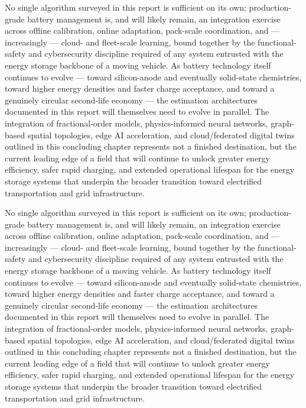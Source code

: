 No single algorithm surveyed in this report is sufficient on its own; production-grade battery management is, and will likely remain, an integration exercise across offline calibration, online adaptation, pack-scale coordination, and — increasingly — cloud- and fleet-scale learning, bound together by the functional-safety and cybersecurity discipline required of any system entrusted with the energy storage backbone of a moving vehicle. As battery technology itself continues to evolve — toward silicon-anode and eventually solid-state chemistries, toward higher energy densities and faster charge acceptance, and toward a genuinely circular second-life economy — the estimation architectures documented in this report will themselves need to evolve in parallel. The integration of fractional-order models, physics-informed neural networks, graph-based spatial topologies, edge AI acceleration, and cloud/federated digital twins outlined in this concluding chapter represents not a finished destination, but the current leading edge of a field that will continue to unlock greater energy efficiency, safer rapid charging, and extended operational lifespan for the energy storage systems that underpin the broader transition toward electrified transportation and grid infrastructure.

No single algorithm surveyed in this report is sufficient on its own; production-grade battery management is, and will likely remain, an integration exercise across offline calibration, online adaptation, pack-scale coordination, and — increasingly — cloud- and fleet-scale learning, bound together by the functional-safety and cybersecurity discipline required of any system entrusted with the energy storage backbone of a moving vehicle. As battery technology itself continues to evolve — toward silicon-anode and eventually solid-state chemistries, toward higher energy densities and faster charge acceptance, and toward a genuinely circular second-life economy — the estimation architectures documented in this report will themselves need to evolve in parallel. The integration of fractional-order models, physics-informed neural networks, graph-based spatial topologies, edge AI acceleration, and cloud/federated digital twins outlined in this concluding chapter represents not a finished destination, but the current leading edge of a field that will continue to unlock greater energy efficiency, safer rapid charging, and extended operational lifespan for the energy storage systems that underpin the broader transition toward electrified transportation and grid infrastructure.